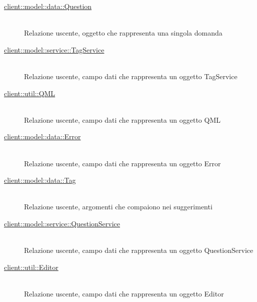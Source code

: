 \begin{description}
\vspace{-7mm}
\begin{description}
	\item[\hyperlink{client::model::data::Question}{client::model::data::Question}] \hfill \\
	Relazione uscente, oggetto che rappresenta una singola domanda
	\item[\hyperlink{client::model::service::TagService}{client::model::service::TagService}] \hfill \\
	Relazione uscente, campo dati che rappresenta un oggetto TagService
	\item[\hyperlink{client::util::QML}{client::util::QML}] \hfill \\
	Relazione uscente, campo dati che rappresenta un oggetto QML
	\item[\hyperlink{client::model::data::Error}{client::model::data::Error}] \hfill \\
	Relazione uscente, campo dati che rappresenta un oggetto Error
	\item[\hyperlink{client::model::data::Tag}{client::model::data::Tag}] \hfill \\
	Relazione uscente, argomenti che compaiono nei suggerimenti
	\item[\hyperlink{client::model::service::QuestionService}{client::model::service::QuestionService}] \hfill \\
	Relazione uscente, campo dati che rappresenta un oggetto QuestionService
	\item[\hyperlink{client::util::Editor}{client::util::Editor}] \hfill \\
	Relazione uscente, campo dati che rappresenta un oggetto Editor
\end{description}


\end{description}
